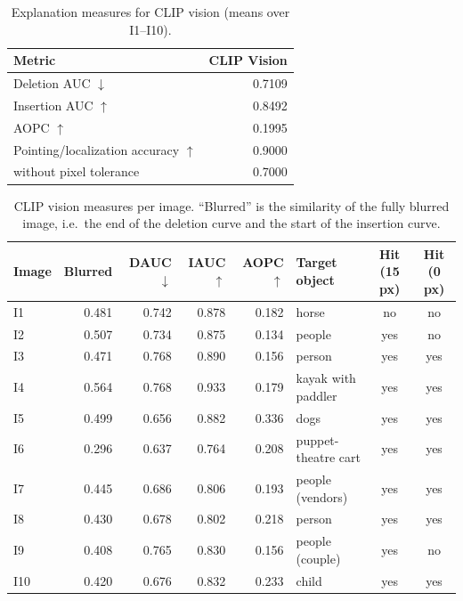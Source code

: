 \documentclass[11pt,a4paper]{article}
\newcommand{\up}{$\uparrow$}
\newcommand{\down}{$\downarrow$}
\begin{document}
\begin{table}[H]
  \centering
  \caption{Explanation measures for CLIP vision (means over I1--I10).}
  \label{tab:vision-metrics}
  \small
  \begin{tabular}{@{}l r@{}}
    \toprule
    Metric & CLIP Vision \\
    \midrule
    Deletion AUC \down                     & 0.7109 \\
    Insertion AUC \up                      & 0.8492 \\
    AOPC \up                               & 0.1995 \\
    Pointing/localization accuracy \up     & 0.9000 \\
    \quad without pixel tolerance          & 0.7000 \\
    \bottomrule
  \end{tabular}
\end{table}

\begin{table}[H]
  \centering
  \caption[CLIP vision measures per image]{CLIP vision measures per image. ``Blurred'' is the
           similarity of the fully blurred image, i.e.\ the end of the deletion curve and the
           start of the insertion curve.}
  \label{tab:vision-images}
  \small
  \begin{tabular}{@{}l r r r r l c c@{}}
    \toprule
    Image & Blurred & DAUC \down & IAUC \up & AOPC \up & Target object & Hit (15 px) & Hit (0 px) \\
    \midrule
    I1  & 0.481 & 0.742 & 0.878 & 0.182 & horse                  & no  & no  \\
    I2  & 0.507 & 0.734 & 0.875 & 0.134 & people                 & yes & no  \\
    I3  & 0.471 & 0.768 & 0.890 & 0.156 & person                 & yes & yes \\
    I4  & 0.564 & 0.768 & 0.933 & 0.179 & kayak with paddler     & yes & yes \\
    I5  & 0.499 & 0.656 & 0.882 & 0.336 & dogs                   & yes & yes \\
    I6  & 0.296 & 0.637 & 0.764 & 0.208 & puppet-theatre cart    & yes & yes \\
    I7  & 0.445 & 0.686 & 0.806 & 0.193 & people (vendors)       & yes & yes \\
    I8  & 0.430 & 0.678 & 0.802 & 0.218 & person                 & yes & yes \\
    I9  & 0.408 & 0.765 & 0.830 & 0.156 & people (couple)        & yes & no  \\
    I10 & 0.420 & 0.676 & 0.832 & 0.233 & child                  & yes & yes \\
    \bottomrule
  \end{tabular}
\end{table}
\end{document}

